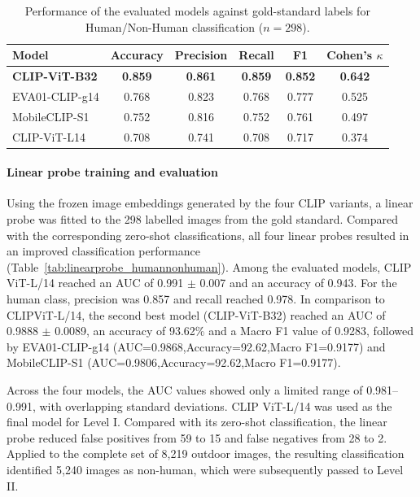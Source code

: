 \documentclass[11pt]{article}
\renewcommand{\_}{\textunderscore\allowbreak{}}
\begin{document}
\begin{table}[htbp]
\centering
\caption{Performance of the evaluated models against gold-standard labels for Human/Non-Human classification ($n=298$).}
\label{tab:gold_standard_validation_humannonhuman}
\begin{tabular}{@{}lccccc@{}}
\toprule
\textbf{Model} & \textbf{Accuracy} & \textbf{Precision} & \textbf{Recall} & \textbf{F1} & \textbf{Cohen's $\kappa$} \\
\midrule
\textbf{CLIP-ViT-B32} & \textbf{0.859} & \textbf{0.861} & \textbf{0.859} & \textbf{0.852} & \textbf{0.642} \\
EVA01-CLIP-g14            & 0.768 & 0.823 & 0.768 & 0.777 & 0.525 \\
MobileCLIP-S1             & 0.752 & 0.816 & 0.752 & 0.761 & 0.497 \\
CLIP-ViT-L14              & 0.708 & 0.741 & 0.708 & 0.717 & 0.374 \\
\bottomrule
\end{tabular}
\end{table}

\paragraph{Linear probe training and evaluation}

Using the frozen image embeddings generated by the four CLIP variants, a linear probe was fitted to the 298 labelled images from the gold standard. Compared with the corresponding zero-shot classifications, all four linear probes resulted in an improved classification performance (Table~\ref{tab:linearprobe_humannonhuman}). Among the evaluated models, CLIP ViT-L/14 reached an AUC of 0.991 $\pm$ 0.007 and an accuracy of 0.943. For the human class, precision was 0.857 and recall reached 0.978. In comparison to CLIPViT-L/14, the second best model (CLIP-ViT-B32) reached an AUC of 0.9888 $\pm$ 0.0089, an accuracy of 93.62\% and a Macro F1 value of 0.9283, followed by EVA01-CLIP-g14 (AUC=0.9868,Accuracy=92.62,Macro F1=0.9177) and MobileCLIP-S1 (AUC=0.9806,Accuracy=92.62,Macro F1=0.9177). 

Across the four models, the AUC values showed only a limited range of 0.981--0.991, with overlapping standard deviations. CLIP ViT-L/14 was used as the final model for Level I. Compared with its zero-shot classification, the linear probe reduced false positives from 59 to 15 and false negatives from 28 to 2. Applied to the complete set of 8,219 outdoor images, the resulting classification identified 5,240 images as non-human, which were subsequently passed to Level II.
\end{document}
